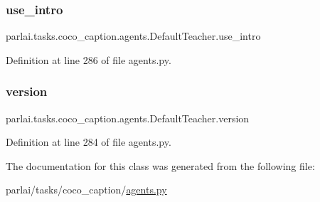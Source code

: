 \subsubsection{\texorpdfstring{use\+\_\+intro}{use\_intro}}
{\footnotesize\ttfamily parlai.\+tasks.\+coco\+\_\+caption.\+agents.\+Default\+Teacher.\+use\+\_\+intro}



Definition at line 286 of file agents.\+py.

\mbox{\label{classparlai_1_1tasks_1_1coco__caption_1_1agents_1_1DefaultTeacher_a5945ea0eff083c797fa85d1174c1a2e3}} 
\subsubsection{\texorpdfstring{version}{version}}
{\footnotesize\ttfamily parlai.\+tasks.\+coco\+\_\+caption.\+agents.\+Default\+Teacher.\+version}



Definition at line 284 of file agents.\+py.



The documentation for this class was generated from the following file\+:\begin{DoxyCompactItemize}
\item 
parlai/tasks/coco\+\_\+caption/\hyperlink{parlai_2tasks_2coco__caption_2agents_8py}{agents.\+py}\end{DoxyCompactItemize}
